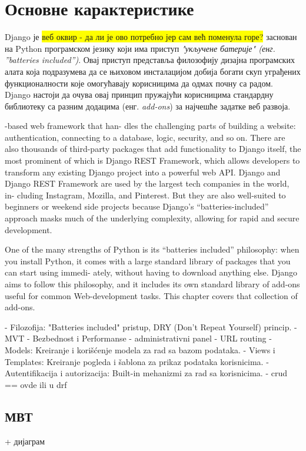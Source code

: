\documentclass[12pt,oneside]{memoir}
\begin{document}
\section{Основне карактеристике}

Django је \colorbox{yellow}{веб оквир - да ли је ово потребно јер сам већ поменула горе?} заснован на Python програмском језику 
који има приступ \textit{"укључене батерије" (енг. ''batteries included'')}. Овај приступ представља филозофију дизајна програмских алата која подразумева да се њиховом инсталацијом добија богати скуп уграђених функционалности које омогућавају корисницима да одмах почну са радом. Django настоји да очува овај принцип пружајући корисницима стандардну библиотеку са разним додацима (енг. \textit{add-ons}) за најчешће задатке веб развоја.


-based web framework that han-
dles the challenging parts of building a website: authentication, connecting to a database, logic,
security, and so on. There are also thousands of third-party packages that add functionality to
Django itself, the most prominent of which is Django REST Framework, which allows developers
to transform any existing Django project into a powerful web API.
Django and Django REST Framework are used by the largest tech companies in the world, in-
cluding Instagram, Mozilla, and Pinterest. But they are also well-suited to beginners or weekend
side projects because Django’s “batteries-included” approach masks much of the underlying
complexity, allowing for rapid and secure development.





One of the many strengths of Python is its “batteries included” philosophy: when you install
Python, it comes with a large standard library of packages that you can start using immedi-
ately, without having to download anything else. Django aims to follow this philosophy, and it
includes its own standard library of add-ons useful for common Web-development tasks. This
chapter covers that collection of add-ons.


- Filozofija: "Batteries included" pristup, DRY (Don't Repeat Yourself) princip.
- MVT
- Bezbednost i Performanse
- administrativni panel
- URL routing
- Models: Kreiranje i korišćenje modela za rad sa bazom podataka.
- Views i Templates: Kreiranje pogleda i šablona za prikaz podataka korisnicima.
- Autentifikacija i autorizacija: Built-in mehanizmi za rad sa korisnicima.
- crud == ovde ili u drf

\subsection{МВТ}
+ дијаграм
\end{document}
